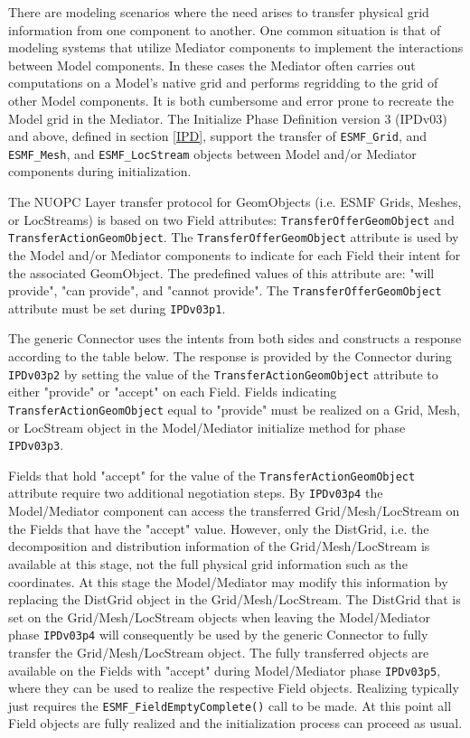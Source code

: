 %

\label{TransferGeom}

There are modeling scenarios where the need arises to transfer physical grid information from one component to another. One common situation is that of modeling systems that utilize Mediator components to implement the interactions between Model components. In these cases the Mediator often carries out computations on a Model's native grid and performs regridding to the grid of other Model components. It is both cumbersome and error prone to recreate the Model grid in the Mediator. The Initialize Phase Definition version 3 (IPDv03) and above, defined in section \ref{IPD}, support the transfer of 
{\tt ESMF\_Grid}, and {\tt ESMF\_Mesh}, and {\tt ESMF\_LocStream} objects between Model and/or Mediator components during initialization.

The NUOPC Layer transfer protocol for GeomObjects (i.e. ESMF Grids, Meshes, or LocStreams) is based on two Field attributes: {\tt TransferOfferGeomObject} and {\tt TransferActionGeomObject}. The {\tt TransferOfferGeomObject} attribute is used by the Model and/or Mediator components to indicate for each Field their intent for the associated GeomObject. The predefined values of this attribute are: "will provide", "can provide", and "cannot provide". The {\tt TransferOfferGeomObject} attribute must be set during {\tt IPDv03p1}.

The generic Connector uses the intents from both sides and constructs a response according to the table below. The response is provided by the Connector during {\tt IPDv03p2} by setting the value of the {\tt TransferActionGeomObject} attribute to either "provide" or "accept" on each Field. Fields indicating {\tt TransferActionGeomObject} equal to "provide" must be realized on a Grid, Mesh, or LocStream object in the Model/Mediator initialize method for phase {\tt IPDv03p3}.

Fields that hold "accept" for the value of the {\tt TransferActionGeomObject} attribute require two additional negotiation steps. By {\tt IPDv03p4} the Model/Mediator component can access the transferred Grid/Mesh/LocStream on the Fields that have the "accept" value. However, only the DistGrid, i.e. the decomposition and distribution information of the Grid/Mesh/LocStream is available at this stage, not the full physical grid information such as the coordinates. At this stage the Model/Mediator may modify this information by replacing the DistGrid object in the Grid/Mesh/LocStream. The DistGrid that is set on the Grid/Mesh/LocStream objects when leaving the Model/Mediator phase {\tt IPDv03p4} will consequently be used by the generic Connector to fully transfer the Grid/Mesh/LocStream object. The fully transferred objects are available on the Fields with "accept" during Model/Mediator phase {\tt IPDv03p5}, where they can be used to realize the respective Field objects. Realizing typically just requires the {\tt ESMF\_FieldEmptyComplete()} call to be made. At this point all Field objects are fully realized and the initialization process can proceed as usual.

